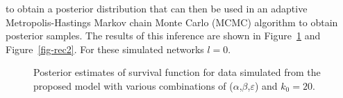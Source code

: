 \documentclass[
  sn-basic,
]{sn-jnl}
\theoremstyle{plain}
\theoremstyle{remark}
\begin{document}
to obtain a posterior distribution that can then be used in an adaptive
Metropolis-Hastings Markov chain Monte Carlo (MCMC) algorithm to obtain
posterior samples. The results of this inference are shown in
Figure~\ref{fig-rec1} and Figure~\ref{fig-rec2}. For these simulated
networks \(l=0\).

\begin{figure}[H]


\caption{\label{fig-rec1}Posterior estimates of survival function for
data simulated from the proposed model with various combinations of
(\(\alpha\),\(\beta\),\(\varepsilon\)) and \(k_0=20\).}

\end{figure}%
\end{document}
